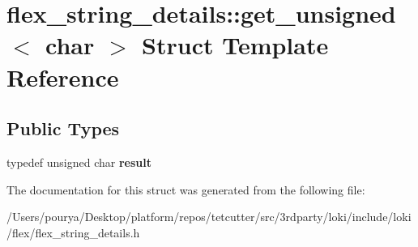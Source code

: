 \hypertarget{structflex__string__details_1_1get__unsigned_3_01char_01_4}{}\section{flex\+\_\+string\+\_\+details\+:\+:get\+\_\+unsigned$<$ char $>$ Struct Template Reference}
\label{structflex__string__details_1_1get__unsigned_3_01char_01_4}
\subsection*{Public Types}
\begin{DoxyCompactItemize}
\item 
\hypertarget{structflex__string__details_1_1get__unsigned_3_01char_01_4_a930522abebca140167c440d9530edcdc}{}typedef unsigned char {\bfseries result}\label{structflex__string__details_1_1get__unsigned_3_01char_01_4_a930522abebca140167c440d9530edcdc}

\end{DoxyCompactItemize}


The documentation for this struct was generated from the following file\+:\begin{DoxyCompactItemize}
\item 
/\+Users/pourya/\+Desktop/platform/repos/tetcutter/src/3rdparty/loki/include/loki/flex/flex\+\_\+string\+\_\+details.\+h\end{DoxyCompactItemize}
